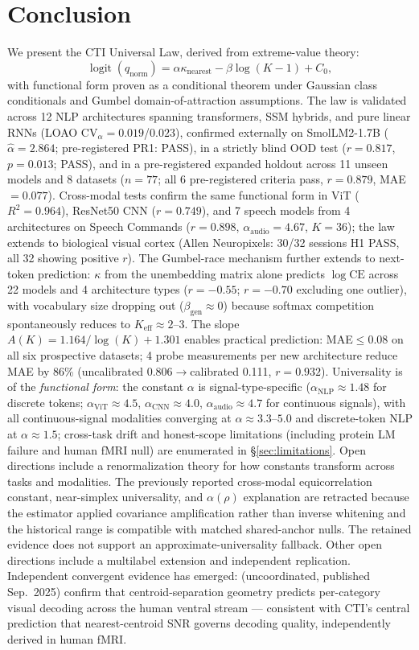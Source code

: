 \documentclass{article}
\DeclareMathOperator{\logit}{logit}
\begin{document}
\section{Conclusion}
We present the CTI Universal Law, derived from extreme-value theory:
\[
\logit(q_{\mathrm{norm}})=\alpha\kappa_{\mathrm{nearest}}-\beta\log(K-1)+C_0,
\]
with functional form proven as a conditional theorem under Gaussian class conditionals and Gumbel domain-of-attraction assumptions.
The law is validated across 12 NLP architectures spanning transformers, SSM hybrids, and pure linear RNNs (LOAO $\mathrm{CV}_\alpha=0.019$/$0.023$), confirmed externally on SmolLM2-1.7B ($\hat\alpha=2.864$; pre-registered PR1: PASS), in a strictly blind OOD test ($r=0.817$, $p=0.013$; PASS), and in a pre-registered expanded holdout across 11 unseen models and 8 datasets ($n=77$; all 6 pre-registered criteria pass, $r=0.879$, MAE$=0.077$).
Cross-modal tests confirm the same functional form in ViT ($R^2=0.964$), ResNet50 CNN ($r=0.749$), and 7 speech models from 4 architectures on Speech Commands ($r=0.898$, $\alpha_\mathrm{audio}=4.67$, $K=36$); the law extends to biological visual cortex (Allen Neuropixels: 30/32 sessions H1 PASS, all 32 showing positive $r$).
The Gumbel-race mechanism further extends to next-token prediction: $\kappa$ from the unembedding matrix alone predicts $\log\mathrm{CE}$ across 22 models and 4 architecture types ($r=-0.55$; $r=-0.70$ excluding one outlier), with vocabulary size dropping out ($\beta_\mathrm{gen}\approx0$) because softmax competition spontaneously reduces to $K_\mathrm{eff}\approx 2$--$3$.
The slope $A(K)=1.164/\log(K)+1.301$ enables practical prediction: MAE$\leq$0.08 on all six prospective datasets; 4 probe measurements per new architecture reduce MAE by 86\% (uncalibrated 0.806$\to$calibrated 0.111, $r=0.932$).
Universality is of the \emph{functional form}: the constant $\alpha$ is signal-type-specific ($\alpha_\mathrm{NLP}\approx1.48$ for discrete tokens; $\alpha_\mathrm{ViT}\approx4.5$, $\alpha_\mathrm{CNN}\approx4.0$, $\alpha_\mathrm{audio}\approx4.7$ for continuous signals), with all continuous-signal modalities converging at $\alpha\approx3.3$--$5.0$ and discrete-token NLP at $\alpha\approx1.5$; cross-task drift and honest-scope limitations (including protein LM failure and human fMRI null) are enumerated in \S\ref{sec:limitations}.
Open directions include a renormalization theory for how constants transform across tasks and modalities.
The previously reported cross-modal equicorrelation constant, near-simplex universality, and $\alpha(\rho)$ explanation are retracted because the estimator applied covariance amplification rather than inverse whitening and the historical range is compatible with matched shared-anchor nulls. The retained evidence does not support an approximate-universality fallback.
Other open directions include a multilabel extension and independent replication.
Independent convergent evidence has emerged: \citet{styves2025} (uncoordinated, published Sep.~2025) confirm that centroid-separation geometry predicts per-category visual decoding across the human ventral stream --- consistent with CTI's central prediction that nearest-centroid SNR governs decoding quality, independently derived in human fMRI.
\end{document}

